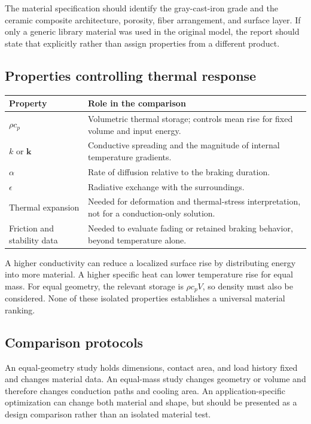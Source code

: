\documentclass[11pt,a4paper]{article}
\begin{document}
The material specification should identify the gray-cast-iron grade and the ceramic composite architecture, porosity, fiber arrangement, and surface layer. If only a generic library material was used in the original model, the report should state that explicitly rather than assign properties from a different product.

\subsection{Properties controlling thermal response}
\begin{tabularx}{\textwidth}{@{}lX@{}}\toprule
Property & Role in the comparison\\\midrule
$\rho c_p$ & Volumetric thermal storage; controls mean rise for fixed volume and input energy.\\
$k$ or $\mathbf k$ & Conductive spreading and the magnitude of internal temperature gradients.\\
$\alpha$ & Rate of diffusion relative to the braking duration.\\
$\epsilon$ & Radiative exchange with the surroundings.\\
Thermal expansion & Needed for deformation and thermal-stress interpretation, not for a conduction-only solution.\\
Friction and stability data & Needed to evaluate fading or retained braking behavior, beyond temperature alone.\\\bottomrule
\end{tabularx}

A higher conductivity can reduce a localized surface rise by distributing energy into more material. A higher specific heat can lower temperature rise for equal mass. For equal geometry, the relevant storage is $\rho c_pV$, so density must also be considered. None of these isolated properties establishes a universal material ranking.

\subsection{Comparison protocols}
An equal-geometry study holds dimensions, contact area, and load history fixed and changes material data. An equal-mass study changes geometry or volume and therefore changes conduction paths and cooling area. An application-specific optimization can change both material and shape, but should be presented as a design comparison rather than an isolated material test.
\end{document}
